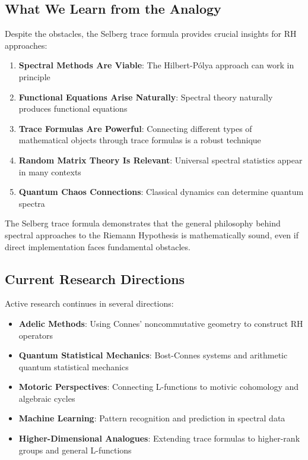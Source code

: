 \subsection{What We Learn from the Analogy}

Despite the obstacles, the Selberg trace formula provides crucial insights for RH approaches:

\begin{enumerate}
\item \textbf{Spectral Methods Are Viable}: The Hilbert-Pólya approach can work in principle
\item \textbf{Functional Equations Arise Naturally}: Spectral theory naturally produces functional equations
\item \textbf{Trace Formulas Are Powerful}: Connecting different types of mathematical objects through trace formulas is a robust technique
\item \textbf{Random Matrix Theory Is Relevant}: Universal spectral statistics appear in many contexts
\item \textbf{Quantum Chaos Connections}: Classical dynamics can determine quantum spectra
\end{enumerate}

\begin{remark}
The Selberg trace formula demonstrates that the general philosophy behind spectral approaches to the Riemann Hypothesis is mathematically sound, even if direct implementation faces fundamental obstacles.
\end{remark}

\subsection{Current Research Directions}

Active research continues in several directions:

\begin{itemize}
\item \textbf{Adelic Methods}: Using Connes' noncommutative geometry to construct RH operators \cite{connes1999}
\item \textbf{Quantum Statistical Mechanics}: Bost-Connes systems and arithmetic quantum statistical mechanics
\item \textbf{Motoric Perspectives}: Connecting L-functions to motivic cohomology and algebraic cycles
\item \textbf{Machine Learning}: Pattern recognition and prediction in spectral data
\item \textbf{Higher-Dimensional Analogues}: Extending trace formulas to higher-rank groups and general L-functions
\end{itemize}

